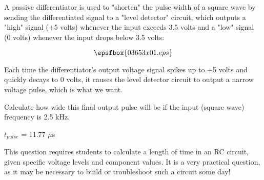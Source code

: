 

A passive differentiator is used to "shorten" the pulse width of a square wave by sending the differentiated signal to a "level detector" circuit, which outputs a "high" signal (+5 volts) whenever the input exceeds 3.5 volts and a "low" signal (0 volts) whenever the input drops below 3.5 volts:

$$\epsfbox{03653x01.eps}$$

Each time the differentiator's output voltage signal spikes up to +5 volts and quickly decays to 0 volts, it causes the level detector circuit to output a narrow voltage pulse, which is what we want.

Calculate how wide this final output pulse will be if the input (square wave) frequency is 2.5 kHz.







$t_{pulse}$ = 11.77 $\mu$s 







This question requires students to calculate a length of time in an RC circuit, given specific voltage levels and component values.  It is a very practical question, as it may be necessary to build or troubleshoot such a circuit some day!




